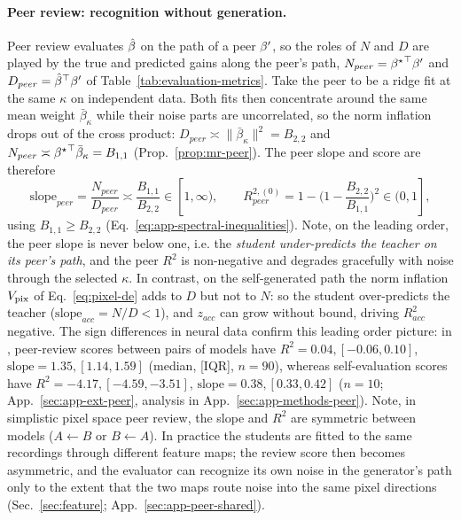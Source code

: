 \paragraph{Peer review: recognition without generation.}
Peer review evaluates $\hat{\beta}$ on the path of a peer ${\beta^{\prime}}$, so the roles of $N$ and $D$ are played by the true and predicted gains along the peer's path, $N_{peer}={{\beta^{\star}}}^\top{\beta^{\prime}}$ and $D_{peer}={\hat{\beta}}^\top{\beta^{\prime}}$ of Table~\ref{tab:evaluation-metrics}. Take the peer to be a ridge fit at the same $\kappa$ on independent data. Both fits then concentrate around the same mean weight $\bar\beta_\kappa$ while their noise parts are uncorrelated, so the norm inflation drops out of the cross product: $D_{peer}\asymp\|\bar\beta_\kappa\|^2=B_{2,2}$ and $N_{peer}\asymp{\beta^{\star}}^\top\bar\beta_\kappa=B_{1,1}$ (Prop.~\ref{prop:mr-peer}). The peer slope and score are therefore
\begin{equation}
\mathrm{slope}_{peer}=\frac{N_{peer}}{D_{peer}}\asymp\frac{B_{1,1}}{B_{2,2}}\in[1,\infty),
\qquad
R^{2,(0)}_{peer}=1-\Big(1-\frac{B_{2,2}}{B_{1,1}}\Big)^2\in(0,1],
\label{eq:peer-de}
\end{equation}
using $B_{1,1}\ge B_{2,2}$ (Eq.~\ref{eq:app-spectral-inequalities}). Note, on the leading order, the peer slope is never below one, i.e. the \textit{student under-predicts the teacher on its peer's path}, and the peer $R^2$ is non-negative and degrades gracefully with noise through the selected $\kappa$. In contrast, on the self-generated path the norm inflation $V_{\rm pix}$ of Eq.~\ref{eq:pixel-de} adds to $D$ but not to $N$:
so the student over-predicts the teacher ($\mathrm{slope}_{acc}=N/D<1$), and $z_{acc}$ can grow without bound, driving $R^2_{acc}$ negative.
The sign differences in neural data confirm this leading order picture: in \citetPW, peer-review scores between pairs of models have $R^2=0.04,[-0.06,0.10]$, $\mathrm{slope}=1.35,[1.14,1.59]$ (median, [IQR], $n=90$), whereas self-evaluation scores have $R^2=-4.17,[-4.59,-3.51]$, $\mathrm{slope}=0.38,[0.33,0.42]$ ($n=10$; App.~\ref{sec:app-ext-peer}, analysis in App.~\ref{sec:app-methods-peer}). %
Note, in simplistic pixel space peer review, the slope and $R^2$ are symmetric between models ($A\leftarrow B$ or $B\leftarrow A$). In practice the students are fitted to the same recordings through different feature maps; the review score then becomes asymmetric, and the evaluator can recognize its own noise in the generator's path only to the extent that the two maps route noise into the same pixel directions (Sec.~\ref{sec:feature}; App.~\ref{sec:app-peer-shared}).
